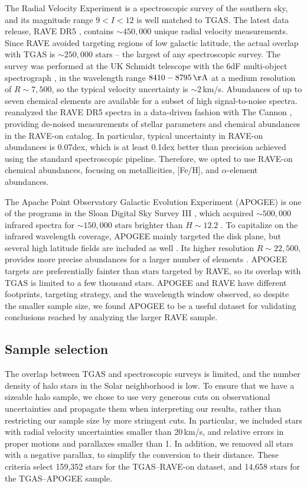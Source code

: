 \documentclass[apj, twocolappendix, numberedappendix, appendixfloats]{emulateapj}
\begin{document}
The Radial Velocity Experiment \citep[RAVE,][]{steinmetz2006} is a spectroscopic survey of the southern sky, and its magnitude range $9<I<12$ is well matched to TGAS.
The latest data release, RAVE DR5 \citep{kunder2017}, contains $\sim450,000$ unique radial velocity measurements.
Since RAVE avoided targeting regions of low galactic latitude, the actual overlap with TGAS is $\sim250,000$ stars -- the largest of any spectroscopic survey.
The survey was performed at the UK Schmidt telescope with the 6dF multi-object spectrograph \citep{6df}, in the wavelength range $8410-8795\,\rm\AA$ at a medium resolution of $R\sim7,500$, so the typical velocity uncertainty is $\sim2$\,km/s.
Abundances of up to seven chemical elements are available for a subset of high signal-to-noise spectra.
\citet{casey2016} reanalyzed the RAVE DR5 spectra in a data-driven fashion with The Cannon \citep{ness2015}, providing de-noised measurements of stellar parameters and chemical abundances in the RAVE-on catalog.
In particular, typical uncertainty in RAVE-on abundances is 0.07\;dex, which is at least 0.1\;dex better than precision achieved using the standard spectroscopic pipeline.
Therefore, we opted to use RAVE-on chemical abundances, focusing on metallicities, [Fe/H], and $\alpha$-element abundances.

The Apache Point Observatory Galactic Evolution Experiment (APOGEE) is one of the programs in the Sloan Digital Sky Survey III \citep{majewski2015, sdss3}, which acquired $\sim500,000$ infrared spectra for $\sim150,000$ stars brighter than $H\sim12.2$ \citep{holtzman2015}.
To capitalize on the infrared wavelength coverage, APOGEE mainly targeted the disk plane, but several high latitude fields are included as well \citep{zasowski2013}.
Its higher resolution $R\sim22,500$, provides more precise abundances for a larger number of elements \citep[e.g.,][]{ness2015}.
APOGEE targets are preferentially fainter than stars targeted by RAVE, so its overlap with TGAS is limited to a few thousand stars.
APOGEE and RAVE have different footprints, targeting strategy, and the wavelength window observed, so despite the smaller sample size, we found APOGEE to be a useful dataset for validating conclusions reached by analyzing the larger RAVE sample.

\subsection{Sample selection}
\label{sample}
The overlap between TGAS and spectroscopic surveys is limited, and the number density of halo stars in the Solar neighborhood is low.
To ensure that we have a sizeable halo sample, we chose to use very generous cuts on observational uncertainties and propagate them when interpreting our results, rather than restricting our sample size by more stringent cuts.
In particular, we included stars with radial velocity uncertainties smaller than 20\,km/s, and relative errors in proper motions and parallaxes smaller than 1.
In addition, we removed all stars with a negative parallax, to simplify the conversion to their distance.
These criteria select 159,352 stars for the TGAS--RAVE-on dataset, and 14,658 stars for the TGAS--APOGEE sample.
\end{document}

